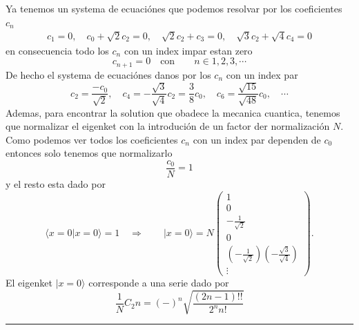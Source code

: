 Ya tenemos un systema de ecuaciónes que podemos resolvar por los coeficientes
$c_n$
\begin{align*}
	c_1 = 0, \quad c_0 + \sqrt 2 c_2 = 0, \quad  \sqrt 2 c_2 + c_3 = 0, \quad
\sqrt 3 c_2 + \sqrt 4 c_4 = 0
\end{align*}
en consecuencia todo los $c_n$ con un index impar estan zero
$$
	c_{n+1} = 0 \quad \text{con} \qquad n \in 1, 2, 3, \cdots
$$
De hecho el systema de ecuaciónes danos por los $c_n$ con un index par 
$$
	c_2 = \frac{-c_0}{\sqrt 2}, \quad c_4 = - \frac{\sqrt 3}{\sqrt 4}c_2 =
\frac{3}{8}c_0, \quad c_6 = \frac{\sqrt{15}}{\sqrt{48}} c_0, \quad
\cdots
$$
Ademas, para encontrar la solution que obadece la mecanica cuantica, tenemos que
normalizar el eigenket con la introdución de un factor der normalización $N$.
Como podemos ver todos los coeficientes $c_n$ con un index par dependen de $c_0$
entonces solo tenemos que normalizarlo
$$ 
	\frac{c_0}{N} = 1
$$ 
y el resto esta dado por
$$
	\langle x = 0| x = 0\rangle = 1 \quad \Rightarrow \qquad | x=0 \rangle = N
\begin{pmatrix}
	1 \\ 0 \\ - \frac{1}{\sqrt 2} \\ 0 \\ \left(-\frac{1}{\sqrt
2}\right)\left(-\frac{\sqrt 3}{\sqrt 4}\right) \\ \vdots  
	\end{pmatrix}.
$$
El eigenket $|x=0\rangle$ corresponde a una serie dado por
$$
	\frac{1}{N} C_2n = (-)^n \sqrt{\frac{(2n-1)!!}{2^n n!}}
$$
	
\rule{\textwidth}{1pt}

	
